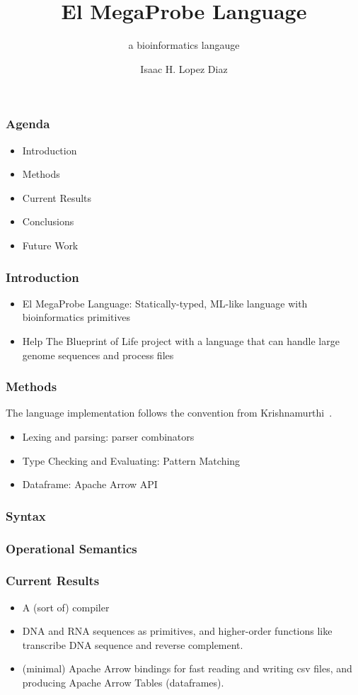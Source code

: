 \documentclass{beamer}
\title{El MegaProbe Language}
\subtitle{a bioinformatics langauge}
\author{Isaac H. Lopez Diaz\inst{1}}
\institute[UPR]
{
    \inst{1}
    Department of Computer Science\\
    University of Puerto Rico
}
\begin{document}
\frame{\begin{titlepage}
    
\end{titlepage}}

\begin{frame}
    \frametitle{Agenda}
    \begin{itemize}
        \item Introduction
        \item Methods
        \item Current Results
        \item Conclusions
        \item Future Work
    \end{itemize}
\end{frame}

\begin{frame}
\frametitle{Introduction}
\begin{itemize}
    \item El MegaProbe Language: Statically-typed, ML-like language with bioinformatics primitives
    \item Help The Blueprint of Life project with a language that can handle large genome sequences and process files
\end{itemize}
\end{frame}

\begin{frame}
\frametitle{Methods}
The language implementation follows the convention from Krishnamurthi~\cite{plai}.
\begin{itemize}
    \item Lexing and parsing: parser combinators~\cite{parser}
    \item Type Checking and Evaluating: Pattern Matching
    \item Dataframe: Apache Arrow API
\end{itemize}
\end{frame}

\begin{frame}
    \frametitle{Syntax}

\end{frame}

\begin{frame}
    \frametitle{Operational Semantics}
\end{frame}
\begin{frame}

\frametitle{Current Results}
\begin{itemize}
    \item A (sort of) compiler 
    \item DNA and RNA sequences as primitives, and higher-order functions like transcribe DNA sequence and reverse complement.
    \item (minimal) Apache Arrow bindings for fast reading and writing csv files, and producing Apache Arrow Tables (dataframes).
\end{itemize}
\end{frame}
\end{document}
